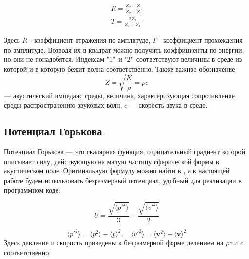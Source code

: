 \begin{equation}
	\label{eq:refl}
	\begin{aligned}
		R=\frac{Z_2-Z_1}{Z_2+Z_1} \\ 
		T=\frac{2 Z_2}{Z_2+Z_1}
	\end{aligned}
\end{equation}

Здесь $R$ - коэффициент отражения по амплитуде, $T$ - коэффициент прохождения по амплитуде. Возводя их в квадрат можно получить коэффициенты по энергии, но они не понадобятся. Индексам  "1"\ и "2"\ соответствуют величины в среде из которой и в которую бежит волна соответственно. Также важное обозначение 
\begin{equation}
	Z = \sqrt{\frac{K}{\rho}} = \rho c
	\label{impedance}
\end{equation}
--- акустический импеданс среды, величина, характеризующая сопротивление среды распространению звуковых волн, $c$ --- скорость звука в среде.

\subsection{Потенциал Горькова}
Потенциал Горькова --- это скалярная функция, отрицательный градиент которой описывает силу, действующую на малую частицу сферической формы в акустическом поле. Оригинальную формулу можно найти в \cite{gorkov}, а в настоящей работе будем использовать безразмерный потенциал, удобный для реализации в программном коде:

\begin{equation}
	U = \frac{\sqrt{ \langle p'^2 \rangle }}{3} - \frac{\sqrt{ \langle v'^2 \rangle }}{2}
\end{equation}

\begin{equation}
	\langle p'^2 \rangle = \langle p^2 \rangle - \langle p \rangle^2, \quad
	\langle v'^2 \rangle = \langle \mathbf{v}^2 \rangle - \langle \mathbf{v} \rangle^2
\end{equation}
Здесь давление и скорость приведены к безразмерной форме делением на $\rho c$ и $c$ соответственно.

\newpage
